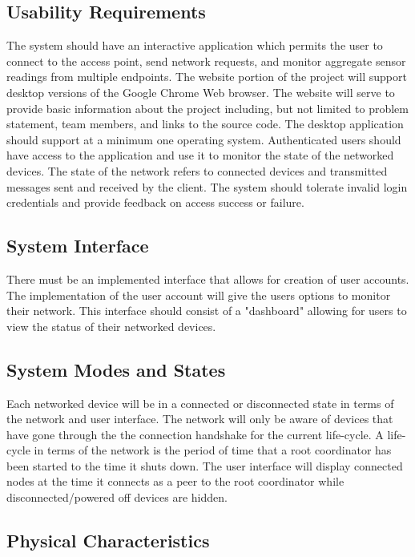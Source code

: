 \documentclass[tikz,a4paper,titlepage]{article}
\begin{document}
\subsection{Usability Requirements} %

The system should have an interactive application which permits the user to connect to the access point, send network requests, and monitor aggregate sensor readings from multiple endpoints. The website portion of the project will support desktop versions of the Google Chrome Web browser. The website will serve to provide basic information about the project including, but not limited to problem statement, team members, and links to the source code. The desktop application should support at a minimum one operating system. Authenticated users should have access to the application and use it to monitor the state of the networked devices. The state of the network refers to connected devices and transmitted messages sent and received by the client. The system should tolerate invalid login credentials and provide feedback on access success or failure.

\subsection{System Interface} %

There must be an implemented interface that allows for creation of user accounts. The implementation of the user account will give the users options to monitor their network. This interface should consist of a "dashboard" allowing for users to view the status of their networked devices.

\subsection{System Modes and States} %

Each networked device will be in a connected or disconnected state in terms of the network and user interface. The network will only be aware of devices that have gone through the the connection handshake for the current life-cycle. A life-cycle in terms of the network is the period of time that a root coordinator has been started to the time it shuts down. The user interface will display connected nodes at the time it connects as a peer to the root coordinator while disconnected/powered off devices are hidden.

\subsection{Physical Characteristics} %
\end{document}
